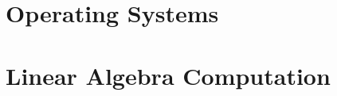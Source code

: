 \graphicspath{{Appendix/Figures/}}

\chapter{Operating Systems}
\label{appendix}
\thispagestyle{myheadings}


\chapter{Linear Algebra Computation}
\label{appendix}
\thispagestyle{myheadings}


